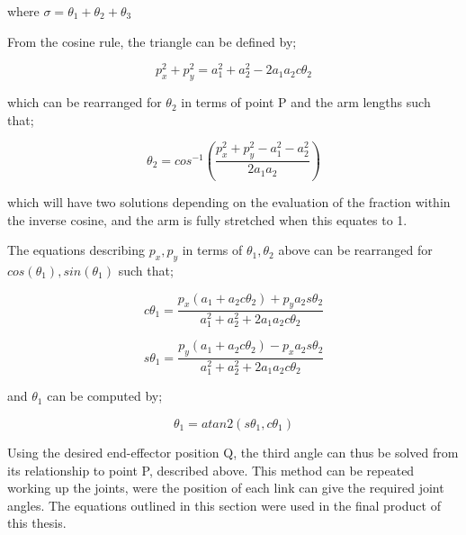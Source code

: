 \documentclass[12pt,openany,a4paper]{book}
\begin{document}
where $\sigma = \theta_1 + \theta_2 + \theta_3$

\vspace{\baselineskip}
From the cosine rule, the triangle can be defined by;

\vspace{\baselineskip}
\begin{equation}
p_x^2 + p_y^2 = a_1^2 + a_2^2 - 2 a_1 a_2 c \theta_2
\end{equation}

\vspace{\baselineskip}
which can be rearranged for $\theta_2$ in terms of point P and the arm lengths such that;

\vspace{\baselineskip}
\begin{equation}
\theta_2 = cos^{-1} ( \frac{p_x^2 + p_y^2 - a_1^2 - a_2^2 }{2 a_1 a_2} )
\end{equation}

\vspace{\baselineskip}
which will have two solutions depending on the evaluation of the fraction within the inverse cosine, and the arm is fully stretched when this equates to 1.

The equations describing $p_x, p_y$ in terms of $\theta_1, \theta_2$ above can be rearranged for $cos(\theta_1), sin(\theta_1)$ such that;

\vspace{\baselineskip}
\begin{equation}
c \theta_1 = \frac{p_x (a_1 + a_2 c \theta_2 ) + p_y a_2 s \theta_2}{a_1^2 + a_2^2 + 2 a_1 a_2 c \theta_2}
\end{equation}


\vspace{\baselineskip}
\begin{equation}
s \theta_1 = \frac{p_y (a_1 + a_2 c \theta_2 ) - p_x a_2 s \theta_2}{a_1^2 + a_2^2 + 2 a_1 a_2 c \theta_2}
\end{equation}

\vspace{\baselineskip}
and $\theta_1$ can be computed by;

\vspace{\baselineskip}
\begin{equation}
\theta_1 = atan2(s\theta_1, c\theta_1)
\end{equation}

\vspace{\baselineskip}
Using the desired end-effector position Q, the third angle can thus be solved from its relationship to point P, described above. This method can be repeated working up the joints, were the position of each link can give the required joint angles. The equations outlined in this section were used in the final product of this thesis.
\end{document}
